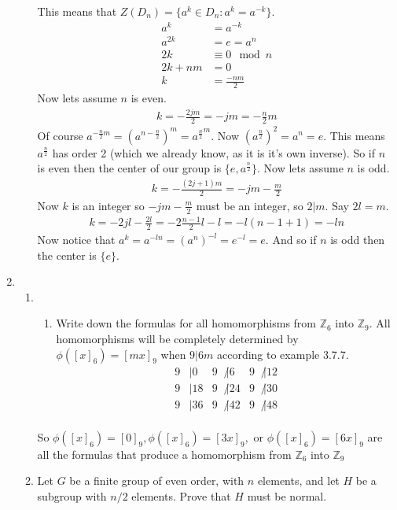 \documentclass[letterpaper]{article}
\begin{document}
\begin{enumerate}
\begin{enumerate}
    This means that $Z(D_n)=\{a^k\in D_n:a^k=a^{-k}\}$.
    \begin{align*}
      a^k&=a^{-k}\\
      a^{2k}&=e=a^n\\
      2k&\equiv 0\mod n\\
      2k+nm&=0\\
      k&=\frac{-nm}{2}
    \end{align*}
    Now lets assume $n$ is even.
    \begin{align*}
      k=-\frac{2jm}{2}=-jm=-\frac{n}{2}m
    \end{align*}
    Of course $a^{-\frac{n}{2}m}=(a^{n-\frac{n}{2}})^m={a^{\frac{n}{2}}}^m$.
    Now $(a^{\frac{n}{2}})^2=a^n=e$.
    This means $a^{\frac{n}{2}}$ has order 2 (which we already know, as it is it's own inverse).
    So if $n$ is even then the center of our group is $\{e,a^{\frac{n}{2}}\}$.
    Now lets assume $n$ is odd.
    \begin{align*}
      k=-\frac{(2j+1)m}{2}=-jm-\frac{m}{2}
    \end{align*}
    Now $k$ is an integer so $-jm-\frac{m}{2}$ must be an integer, so $2|m$.
    Say $2l=m$.
    \begin{align*}
      k=-2jl-\frac{2l}{2}=-2\frac{n-1}{2}l-l=-l(n-1+1)=-ln
    \end{align*}
    Now notice that $a^k=a^{-ln}=(a^n)^{-l}=e^{-l}=e$.
    And so if $n$ is odd then the center is $\{e\}$.
  \end{enumerate}
\item
  \begin{enumerate}
  \item
    \begin{enumerate}
    \item
      Write down the formulas for all homomorphisms from $\mathbb{Z}_6$ into $\mathbb{Z}_9$.
      All homomorphisms will be completely determined by $\phi([x]_6)=[mx]_9$ when $9|6m$ according to example 3.7.7.
      \begin{align*}
      9&|0&
      9&{\not|} 6&
      9&{\not|} 12\\
      9&| 18&
      9&{\not|} 24&
      9&{\not|} 30\\
      9&| 36&
      9&{\not|} 42&
      9&{\not|} 48\\
      \end{align*}
    \end{enumerate}
    So $\phi([x]_6)=[0]_9, \phi([x]_6)=[3x]_9,$ or $\phi([x]_6)=[6x]_9$ are all the formulas that produce a homomorphism from $\mathbb{Z}_6$ into $\mathbb{Z}_9$
  \setcounter{enumii}{15}
  \item
    Let $G$ be a finite group of even order, with $n$ elements, and let $H$ be a subgroup with $n/2$ elements. Prove that $H$ must be normal.


\end{enumerate}
\end{enumerate}
\end{document}
